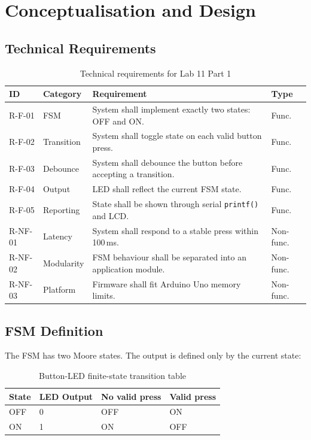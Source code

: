 \documentclass[12pt]{article}
\begin{document}
\section{Conceptualisation and Design}

\subsection{Technical Requirements}

\begin{table}[H]
\centering
\small
\begin{tabular}{p{1.5cm} p{2.5cm} p{7.2cm} p{1.3cm}}
\toprule
\textbf{ID} & \textbf{Category} & \textbf{Requirement} & \textbf{Type} \\
\midrule
R-F-01 & FSM & System shall implement exactly two states: OFF and ON. & Func. \\
R-F-02 & Transition & System shall toggle state on each valid button press. & Func. \\
R-F-03 & Debounce & System shall debounce the button before accepting a transition. & Func. \\
R-F-04 & Output & LED shall reflect the current FSM state. & Func. \\
R-F-05 & Reporting & State shall be shown through serial \texttt{printf()} and LCD. & Func. \\
R-NF-01 & Latency & System shall respond to a stable press within 100\,ms. & Non-func. \\
R-NF-02 & Modularity & FSM behaviour shall be separated into an application module. & Non-func. \\
R-NF-03 & Platform & Firmware shall fit Arduino Uno memory limits. & Non-func. \\
\bottomrule
\end{tabular}
\caption{Technical requirements for Lab 11 Part 1}
\label{tab:requirements}
\end{table}

\subsection{FSM Definition}
\hspace{0.8cm} The FSM has two Moore states. The output is defined only by the current state:

\begin{table}[H]
\centering
\begin{tabular}{llll}
\toprule
\textbf{State} & \textbf{LED Output} & \textbf{No valid press} & \textbf{Valid press} \\
\midrule
OFF & 0 & OFF & ON \\
ON & 1 & ON & OFF \\
\bottomrule
\end{tabular}
\caption{Button-LED finite-state transition table}
\label{tab:fsm}
\end{table}
\end{document}
